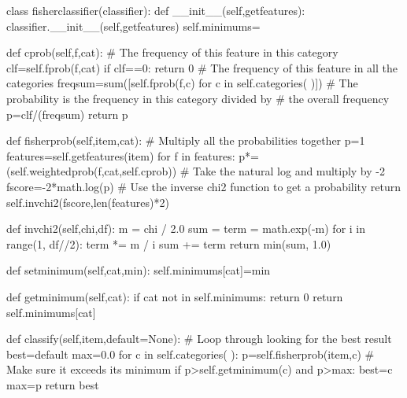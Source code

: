 \documentclass[12pt, letterpaper]{article}
\begin{document}
\begin{MyPython}[caption= Fisher Method, label=lst:fishermethod]
class fisherclassifier(classifier):
    def __init__(self,getfeatures):
        classifier.__init__(self,getfeatures)
        self.minimums={}
    
    def cprob(self,f,cat):
        # The frequency of this feature in this category
        clf=self.fprob(f,cat)
        if clf==0:
            return 0
        # The frequency of this feature in all the categories
        freqsum=sum([self.fprob(f,c) for c in self.categories( )])
        # The probability is the frequency in this category divided by
        # the overall frequency
        p=clf/(freqsum)
        return p

    def fisherprob(self,item,cat):
        # Multiply all the probabilities together
        p=1
        features=self.getfeatures(item)
        for f in features:
            p*=(self.weightedprob(f,cat,self.cprob))
            # Take the natural log and multiply by -2
            fscore=-2*math.log(p)
        # Use the inverse chi2 function to get a probability
        return self.invchi2(fscore,len(features)*2)

    def invchi2(self,chi,df):
        m = chi / 2.0
        sum = term = math.exp(-m)
        for i in range(1, df//2):
            term *= m / i
            sum += term
        return min(sum, 1.0)

    def setminimum(self,cat,min):
        self.minimums[cat]=min

    def getminimum(self,cat):
        if cat not in self.minimums:
            return 0
        return self.minimums[cat]

    def classify(self,item,default=None):
        # Loop through looking for the best result
        best=default
        max=0.0
        for c in self.categories( ):
            p=self.fisherprob(item,c)
            # Make sure it exceeds its minimum
            if p>self.getminimum(c) and p>max:
                best=c
                max=p
        return best
\end{MyPython}
\end{document}
